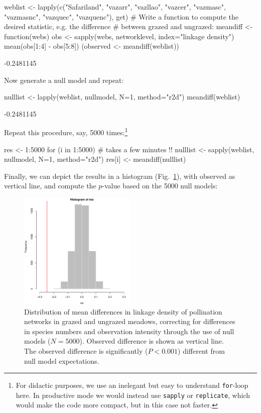 \documentclass[a4paper, 11pt]{article}\usepackage[]{graphicx}\usepackage[]{color}
\begin{document}
\begin{Schunk}
\begin{Sinput}
weblist <- lapply(c("Safariland", "vazarr", "vazllao", "vazcer", "vazmasc", 
                       "vazmasnc", "vazquec", "vazquenc"), get)
# Write a function to compute the desired statistic, e.g. the difference 
# between grazed and ungrazed:
meandiff <- function(webs){
   obs <- sapply(webs, networklevel, index="linkage density")  
   mean(obs[1:4] - obs[5:8])
}
(observed <- meandiff(weblist))
\end{Sinput}
\begin{Soutput}
[1] -0.2481145
\end{Soutput}
\end{Schunk}
Now generate a null model and repeat:
\begin{Schunk}
\begin{Sinput}
nulllist <- lapply(weblist, nullmodel, N=1, method="r2d")
meandiff(weblist)
\end{Sinput}
\begin{Soutput}
[1] -0.2481145
\end{Soutput}
\end{Schunk}
Repeat this procedure, say, 5000 times:\footnote{For didactic purposes, we use an inelegant but easy to understand \texttt{for}-loop here. In productive mode we would instead use \texttt{sapply} or \texttt{replicate}, which would make the code more compact, but in this case not faster.}
\begin{Schunk}
\begin{Sinput}
res <- 1:5000
for (i in 1:5000){ # takes a few minutes !!
   nulllist <- sapply(weblist, nullmodel, N=1, method="r2d")
   res[i] <- meandiff(nulllist)  
}
\end{Sinput}
\end{Schunk}
Finally, we can depict the results in a histogram (Fig.~\ref{fig:cattlenull}), with observed as vertical line, and compute the $p$-value based on the 5000 null models:
%
\begin{figure}
\centering
\includegraphics[width=0.5\textwidth]{figures/cattle_nullmodelled}
\caption{Distribution of mean differences in linkage density of pollination networks in grazed and ungrazed meadows, correcting for differences in species numbers and observation intensity through the use of null models ($N=5000$). Observed difference is shown as vertical line. The observed difference is significantly ($P<0.001$) different from null model expectations.}
\label{fig:cattlenull}
\end{figure}
\end{document}
